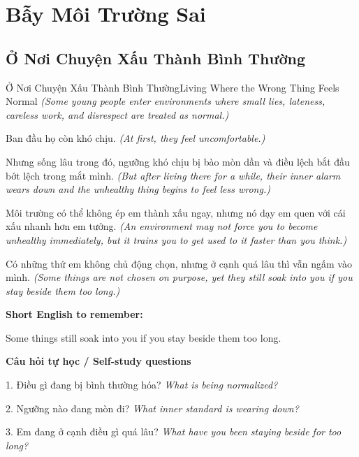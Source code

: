 \chapter{Bẫy Môi Trường Sai}

\section{Ở Nơi Chuyện Xấu Thành Bình Thường}
\begin{truyen}{Ở Nơi Chuyện Xấu Thành Bình Thường}{Living Where the Wrong Thing Feels Normal}
\textit{(Some young people enter environments where small lies, lateness, careless work, and disrespect are treated as normal.)}

Ban đầu họ còn khó chịu.
\textit{(At first, they feel uncomfortable.)}

Nhưng sống lâu trong đó, ngưỡng khó chịu bị bào mòn dần và điều lệch bắt đầu bớt lệch trong mắt mình.
\textit{(But after living there for a while, their inner alarm wears down and the unhealthy thing begins to feel less wrong.)}

Môi trường có thể không ép em thành xấu ngay, nhưng nó dạy em quen với cái xấu nhanh hơn em tưởng.
\textit{(An environment may not force you to become unhealthy immediately, but it trains you to get used to it faster than you think.)}

\end{truyen}

\begin{baihoc}
Có những thứ em không chủ động chọn, nhưng ở cạnh quá lâu thì vẫn ngấm vào mình.
\textit{(Some things are not chosen on purpose, yet they still soak into you if you stay beside them too long.)}
\end{baihoc}

\begin{ghinhoanh}
\textbf{Short English to remember:}

Some things still soak into you if you stay beside them too long.

\end{ghinhoanh}

\begin{tuhocnhanh}
\textbf{Câu hỏi tự học / Self-study questions}

1. Điều gì đang bị bình thường hóa? \textit{What is being normalized?}

2. Ngưỡng nào đang mòn đi? \textit{What inner standard is wearing down?}

3. Em đang ở cạnh điều gì quá lâu? \textit{What have you been staying beside for too long?}
\end{tuhocnhanh}
\ngancach

